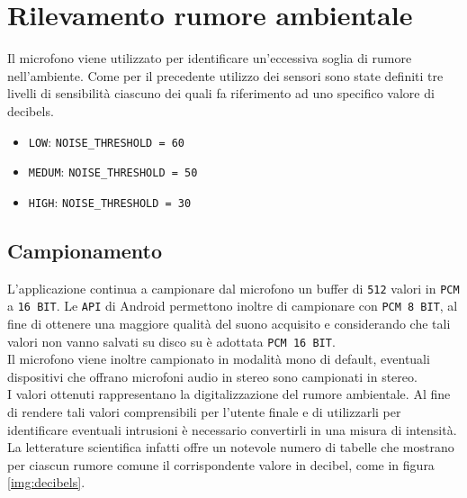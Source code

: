 \section{Rilevamento rumore ambientale}
Il microfono viene utilizzato per identificare un'eccessiva soglia di rumore nell'ambiente. Come per il precedente utilizzo dei sensori sono state definiti tre livelli di sensibilità ciascuno dei quali fa riferimento ad uno specifico valore di decibels.

\begin{itemize}
	\item \texttt{LOW}: \texttt{NOISE\_THRESHOLD = 60}
	\item \texttt{MEDUM}:  \texttt{NOISE\_THRESHOLD = 50}
	\item \texttt{HIGH}:  \texttt{NOISE\_THRESHOLD = 30}
\end{itemize}

\subsection{Campionamento}
L'applicazione continua a campionare dal microfono un buffer di \texttt{512} valori in \texttt{PCM} a \texttt{16 BIT}.
Le \texttt{API} di Android permettono inoltre di campionare con \texttt{PCM 8 BIT}, al fine di ottenere una maggiore qualità del suono acquisito e considerando che tali valori non vanno salvati su disco su è adottata \texttt{PCM 16 BIT}.\\
Il microfono viene inoltre campionato in modalità mono di default, eventuali dispositivi che offrano microfoni audio in stereo sono campionati in stereo.\\

I valori ottenuti rappresentano la digitalizzazione del rumore ambientale. Al fine di rendere tali valori comprensibili per l'utente finale e di utilizzarli per identificare eventuali intrusioni è necessario convertirli in una misura di intensità. La letterature scientifica infatti offre un notevole numero di tabelle che mostrano per ciascun rumore comune il corrispondente valore in decibel, come in figura \ref{img:decibels}. 

